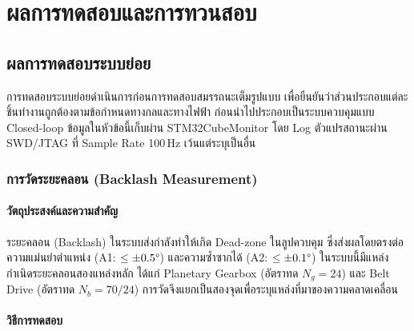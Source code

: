 
\chapter{ผลการทดสอบและการทวนสอบ}
\label{ch:results}


\section{ผลการทดสอบระบบย่อย}
\label{sec:subsystem_test}

การทดสอบระบบย่อยดำเนินการก่อนการทดสอบสมรรถนะเต็มรูปแบบ
เพื่อยืนยันว่าส่วนประกอบแต่ละชิ้นทำงานถูกต้องตามข้อกำหนดทางกลและทางไฟฟ้า
ก่อนนำไปประกอบเป็นระบบควบคุมแบบ Closed-loop
ข้อมูลในหัวข้อนี้เก็บผ่าน STM32CubeMonitor โดย Log ตัวแปรสถานะผ่าน
SWD/JTAG ที่ Sample Rate 100\,Hz เว้นแต่ระบุเป็นอื่น

\subsection{การวัดระยะคลอน (Backlash Measurement)}
\label{subsec:backlash}

\subsubsection{วัตถุประสงค์และความสำคัญ}

ระยะคลอน (Backlash) ในระบบส่งกำลังทำให้เกิด Dead-zone ในลูปควบคุม
ซึ่งส่งผลโดยตรงต่อความแม่นยำตำแหน่ง (A1: $\leq \pm 0.5\degree$)
และความซ้ำซากได้ (A2: $\leq \pm 0.1\degree$)
ในระบบนี้มีแหล่งกำเนิดระยะคลอนสองแหล่งหลัก ได้แก่
Planetary Gearbox (อัตราทด $N_g = 24$) และ Belt Drive (อัตราทด $N_b = 70/24$)
การวัดจึงแยกเป็นสองจุดเพื่อระบุแหล่งที่มาของความคลาดเคลื่อน

\subsubsection{วิธีการทดสอบ}

